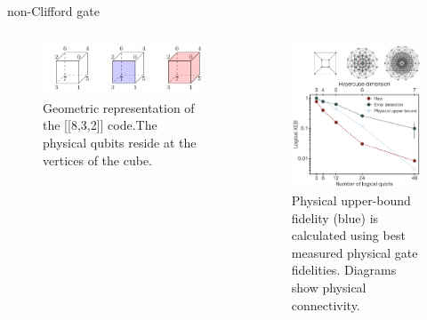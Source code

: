 \documentclass[18 pt]{beamer}
\begin{document}
\begin{frame}{non-Clifford gate}
  \begin{columns}
    \begin{column}{.5\textwidth}
      \begin{figure}
        \includegraphics[width=\textwidth]{IMG/code.png}
        \caption{Geometric representation of the [[8,3,2]] code.The physical qubits reside at the vertices of the cube.}
      \end{figure}
    \end{column}
    \begin{column}{.5\textwidth}
      \begin{figure}
        \includegraphics[width=.8\textwidth]{IMG/XEB.png}
        \caption{Physical upper-bound fidelity (blue) is calculated using best measured physical gate fidelities. Diagrams show physical connectivity.}
      \end{figure}
    \end{column}
  \end{columns}
\end{frame}
\end{document}
